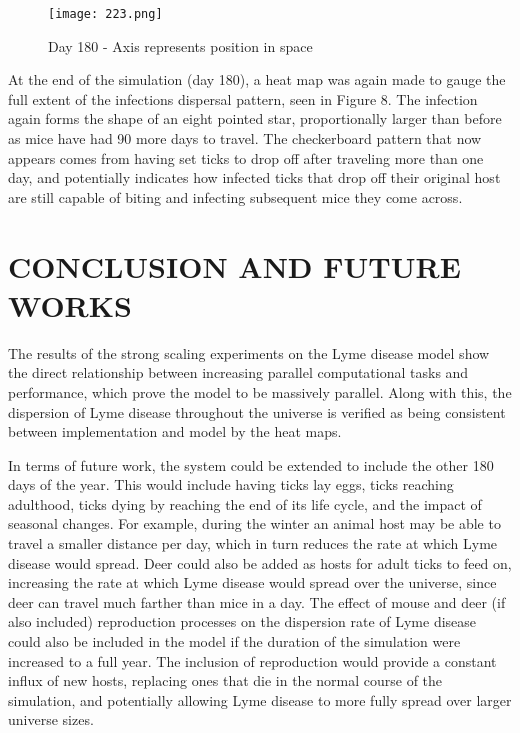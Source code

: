 \documentclass[letterpaper, 10 pt, conference]{ieeeconf}  %
\begin{document}
\begin{figure}[!htbp]
  \texttt{[image: 223.png]}
  \caption{Day 180 - Axis represents position in space}
\end{figure}  

At the end of the simulation (day 180), a heat map was again made to gauge the full extent of the infections dispersal pattern, seen in Figure 8.  The infection again forms the shape of an eight pointed star, proportionally larger than before as mice have had 90 more days to travel.  The checkerboard pattern that now appears comes from having set ticks to drop off after traveling more than one day, and potentially indicates how infected ticks that drop off their original host are still capable of biting and infecting subsequent mice they come across.

\section{CONCLUSION AND FUTURE WORKS}

The results of the strong scaling experiments on the Lyme disease model show the direct relationship between increasing parallel computational tasks and performance, which prove the model to be massively parallel.  Along with this, the dispersion of Lyme disease throughout the universe is verified as being consistent between implementation and model by the heat maps.  

In terms of future work, the system could be extended to include the other 180 days of the year.  This would include having ticks lay eggs, ticks reaching adulthood, ticks dying by reaching the end of its life cycle, and the impact of seasonal changes.  For example, during the winter an animal host may be able to travel a smaller distance per day, which in turn reduces the rate at which Lyme disease would spread.  Deer could also be added as hosts for adult ticks to feed on, increasing the rate at which Lyme disease would spread over the universe, since deer can travel much farther than mice in a day.  The effect of mouse and deer (if also included) reproduction processes on the dispersion rate of Lyme disease could also be included in the model if the duration of the simulation were increased to a full year.  The inclusion of reproduction would provide a constant influx of new hosts, replacing ones that die in the normal course of the simulation, and potentially allowing Lyme disease to more fully spread over larger universe sizes.  
\end{document}
